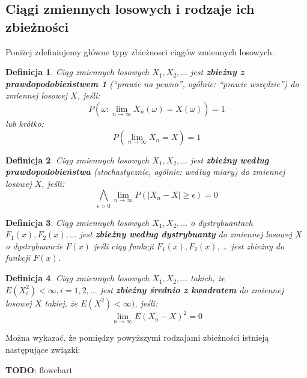 \documentclass[10pt,a4paper]{article}
\newtheorem{defin}{Definicja}[section]
\begin{document}
\subsection{Ciągi zmiennych losowych i rodzaje ich zbieżności}
Poniżej zdefiniujemy główne typy zbieżnosci ciągów zmiennych losowych.
\begin{defin}
Ciąg zmiennych losowych $X_1, X_2, \ldots$ jest \textbf{zbieżny z prawdopodobieństwem 1} (``prawie na pewno'', ogólnie: ``prawie wszędzie'') do zmiennej
losowej $X$, jeśli:
\begin{equation}
P(\omega: \lim_{n\rightarrow\infty}X_n(\omega)=X(\omega))=1
\end{equation}
lub krótko:
\begin{equation}
P(\lim_{n\rightarrow\infty}X_n=X)=1
\end{equation}
\end{defin}
\begin{defin}
Ciąg zmiennych losowych $X_1, X_2, \ldots$ jest \textbf{zbieżny według prawdopodobieństwa} (stochastycznie, ogólnie: według miary) do zmiennej
losowej $X$, jeśli:
\begin{equation}
\bigwedge_{\epsilon>0} \lim_{n\rightarrow\infty} P(|X_n-X|\geq\epsilon) = 0
\end{equation}
\end{defin}
\begin{defin}
Ciąg zmiennych losowych $X_1, X_2, \ldots$ o dystrybuantach $F_1(x), F_2(x), \ldots$ jest \textbf{zbieżny według dystrybuanty} do zmiennej 
losowej $X$ o dystrybuancie $F(x)$ jeśli ciąg funkcji $F_1(x), F_2(x), \ldots$ jest zbieżny do funkcji $F(x)$.
\end{defin}
\begin{defin}
Ciąg zmiennych losowych $X_1, X_2, \ldots$ takich, że $E(X_i^2)<\infty, i=1,2,\ldots$ jest \textbf{zbieżny średnio z kwadratem} do zmiennej losowej $X$
takiej, że $E(X^2)<\infty)$, jeśli:
\begin{equation}
\lim_{n\rightarrow\infty}E(X_n-X)^2=0
\end{equation}
\end{defin}
Można wykazać, że pomiędzy powyższymi rodzajami zbieżności istnieją następujące związki:
\begin{center}
\textbf{TODO}: flowchart
\end{center}
\end{document}
